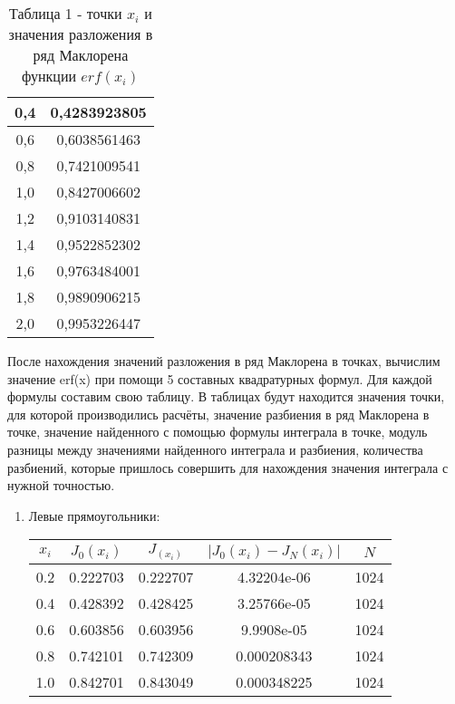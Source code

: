 \documentclass[a4paper,12pt]{article}
\begin{document}
{\begin{table}[h]
\begin{tabular}{|c|c|}
        \hline
        0,4 & 0,4283923805\\
        \hline
        0,6 & 0,6038561463\\
        \hline
        0,8 & 0,7421009541\\
        \hline
        1,0 & 0,8427006602\\
        \hline
        1,2 & 0,9103140831\\
        \hline
        1,4 & 0,9522852302\\
        \hline
        1,6 & 0,9763484001\\
        \hline
        1,8 & 0,9890906215\\
        \hline
        2,0 & 0,9953226447\\
        \hline
    \end{tabular}
    \caption*{\small{Таблица 1 - точки $x_i$ и значения разложения в ряд Маклорена функции $erf(x_i)$}}
\end{table}
\newpage
После нахождения значений разложения в ряд Маклорена в точках, вычислим значение erf(x) при помощи 5 составных квадратурных формул. Для каждой формулы составим свою таблицу. В таблицах будут находится значения точки, для которой производились расчёты, значение разбиения в ряд Маклорена в точке, значение найден\-ного с помощью формулы интеграла в точке, модуль разницы между значениями найде\-нного интеграла и разбиения, количества разбиений, которые пришлось совершить для нахожде\-ния значения интеграла с нужной точностью.
\begin{enumerate}[label = \arabic*.]
    \item {Левые прямоугольники:
        \begin{table}[h]
        \centering
        \begin{tabular}{|c|c|c|c|c|}
            \hline
            $x_i$ & $J_0(x_i)$ & $J_(x_i)$ & $\left|J_0(x_i) - J_N(x_i)\right|$ & $N$\\
            \hline
            0.2 &  0.222703 &  0.222707 & 4.32204e-06 & 1024\\
            \hline
            0.4 &  0.428392 &  0.428425 & 3.25766e-05 & 1024\\
            \hline
            0.6 &  0.603856 &  0.603956 &  9.9908e-05 & 1024\\
            \hline
            0.8 &  0.742101 &  0.742309 & 0.000208343 & 1024\\
            \hline
            1.0 &  0.842701 &  0.843049 & 0.000348225 & 1024\\
            \hline

\end{tabular}
\end{table}}
\end{enumerate}}
\end{document}
